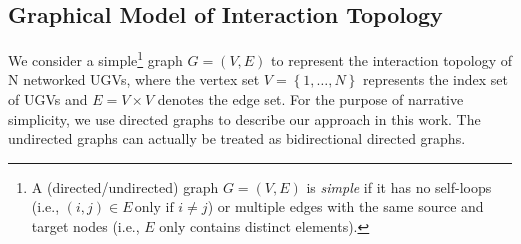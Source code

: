 	
	
	
	\subsection{Graphical Model of Interaction Topology}
	We consider a simple\footnote{A (directed/undirected) graph $G=(V,E)$ is \textit{simple} if it has no self-loops (i.e., $\left( i,j\right)\in E\,\text{only if } i\neq j$) or multiple edges with the same source and target nodes (i.e., $E$ only contains distinct elements).} graph $G=(V,E)$ to represent the interaction topology of N networked UGVs, where the vertex set $V=\left\lbrace 1,\dots,N\right\rbrace $ represents the index set of UGVs and $E=V\times V$ denotes the edge set. 
	For the purpose of narrative simplicity, we use directed graphs to describe our approach in this work.
	The undirected graphs can actually be treated as bidirectional directed graphs.
	
